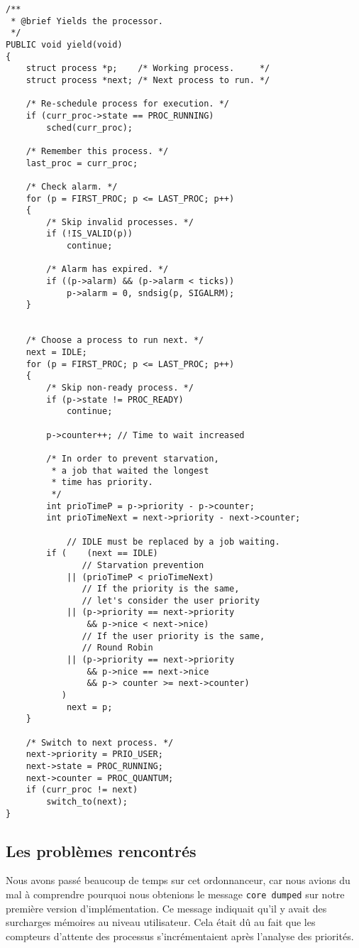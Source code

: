 \begin{lstlisting}
/**
 * @brief Yields the processor.
 */
PUBLIC void yield(void)
{
	struct process *p;    /* Working process.     */
	struct process *next; /* Next process to run. */

	/* Re-schedule process for execution. */
	if (curr_proc->state == PROC_RUNNING)
		sched(curr_proc);

	/* Remember this process. */
	last_proc = curr_proc;

	/* Check alarm. */
	for (p = FIRST_PROC; p <= LAST_PROC; p++)
	{
		/* Skip invalid processes. */
		if (!IS_VALID(p))
			continue;

		/* Alarm has expired. */
		if ((p->alarm) && (p->alarm < ticks))
			p->alarm = 0, sndsig(p, SIGALRM);
	}
	

	/* Choose a process to run next. */
	next = IDLE;
	for (p = FIRST_PROC; p <= LAST_PROC; p++)
	{
		/* Skip non-ready process. */
		if (p->state != PROC_READY)
			continue;

		p->counter++; // Time to wait increased

		/* In order to prevent starvation,
		 * a job that waited the longest
		 * time has priority.
		 */
		int prioTimeP = p->priority - p->counter;
		int prioTimeNext = next->priority - next->counter;

			// IDLE must be replaced by a job waiting.
		if (	(next == IDLE)
			   // Starvation prevention
			|| (prioTimeP < prioTimeNext)
			   // If the priority is the same,
			   // let's consider the user priority
			|| (p->priority == next->priority
				&& p->nice < next->nice)
			   // If the user priority is the same,
			   // Round Robin
			|| (p->priority == next->priority
				&& p->nice == next->nice
				&& p-> counter >= next->counter)
		   )
			next = p;
	}

	/* Switch to next process. */
	next->priority = PRIO_USER;
	next->state = PROC_RUNNING;
	next->counter = PROC_QUANTUM;
	if (curr_proc != next)
		switch_to(next);
}
\end{lstlisting}

\subsection{Les problèmes rencontrés}

Nous avons passé beaucoup de temps sur cet ordonnanceur, car nous avions du mal à comprendre pourquoi nous obtenions le message \texttt{core dumped} sur notre première version d'implémentation.
Ce message indiquait qu'il y avait des surcharges mémoires au niveau utilisateur.
Cela était dû au fait que les compteurs d'attente des processus s'incrémentaient après l'analyse des priorités.
